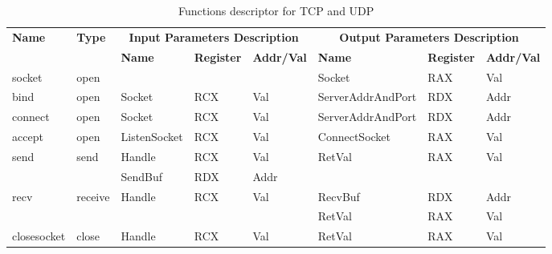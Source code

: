 \documentclass[12pt,oneside]{book}
\begin{document}
\begin{table}[H]
  \centering
  \caption{Functions descriptor for TCP and UDP}
  \label{tcpupdfunctions}
\begin{tabular}{|l|l|l|l|l|l|l|l|}
\hline
             \multirow{2}{*}{{\textbf{Name}}} & \multirow{2}{*}{{\textbf{Type}}} & \multicolumn{3}{c|}{\textbf{Input Parameters Description}} & \multicolumn{3}{c|}{\textbf{Output Parameters Description}} \\
              \cline{3-8} 
             & & \textbf{Name}& \textbf{Register} & \textbf{Addr/Val} & \textbf{Name}& \textbf{Register} &  \textbf{Addr/Val}  \\
             \hline
      socket
       &open &  &   &  &  Socket & RAX & Val\\ 
      \hline
      bind
       &open & Socket &  RCX & Val &  ServerAddrAndPort & RDX & Addr\\
      \hline   
            connect
       &open & Socket &  RCX & Val &  ServerAddrAndPort & RDX & Addr\\
      \hline   
     accept
       &open &  ListenSocket & RCX & Val & ConnectSocket & RAX & Val\\
      \hline                    
      \multirow{2}{*}{send}
       &\multirow{2}{*}{send} &  Handle & RCX & Val & \multirow{2}{*}{RetVal}& \multirow{2}{*}{RAX} & \multirow{2}{*}{Val} \\
       \cline{3-5}
      & & SendBuf& RDX&Addr &  &  & \\
      \hline            
      \multirow{2}{*}{recv}
       &\multirow{2}{*}{receive}&  \multirow{2}{*}{Handle} & \multirow{2}{*}{RCX} & \multirow{2}{*}{Val}& RecvBuf& RDX&Addr\\
       \cline{6-8}
      & &  &   &  &  RetVal & RAX & Val\\ 
      \hline      
      closesocket &
       close &  Handle & RCX & Val & RetVal & RAX & Val\\
      \hline                          
  \end{tabular}    
\end{table}
\end{document}
